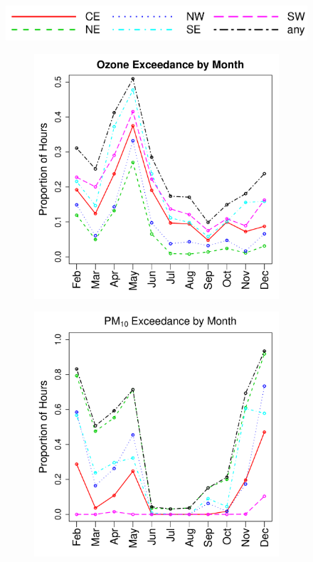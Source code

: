\documentclass[alpha-refs]{wiley-article}
\begin{document}
\vspace{-5mm}
\begin{figure}[H]
  \begin{center}
  \includegraphics[width=.6\textwidth]{legis_legend}

 \vspace{-2mm}

   \begin{subfigure}[b]{.32\textwidth}
      \includegraphics[width=\textwidth]{ozone_bymonth}
   \end{subfigure}
      \begin{subfigure}[b]{.32\textwidth}
      \includegraphics[width=\textwidth]{pm10_bymonth}

\end{subfigure}
\end{center}
\end{figure}
\end{document}
